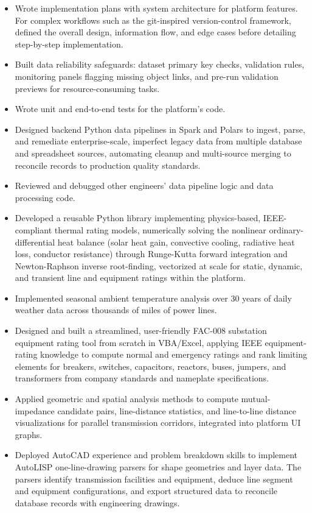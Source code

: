 \documentclass[10pt, letterpaper]{article}
\newenvironment{rlist}{%
  \begin{itemize}[leftmargin=1.4em, itemsep=1pt, topsep=2pt, parsep=0pt]%
}{%
  \end{itemize}%
}
\begin{document}
\begin{rlist}
  \item Wrote implementation plans with system architecture for platform features. For complex workflows such as the git-inspired version-control framework, defined the overall design, information flow, and edge cases before detailing step-by-step implementation.
  \item Built data reliability safeguards: dataset primary key checks, validation rules, monitoring panels flagging missing object links, and pre-run validation previews for resource-consuming tasks.
  \item Wrote unit and end-to-end tests for the platform's code.
  \item Designed backend Python data pipelines in Spark and Polars to ingest, parse, and remediate enterprise-scale, imperfect legacy data from multiple database and spreadsheet sources, automating cleanup and multi-source merging to reconcile records to production quality standards.
  \item Reviewed and debugged other engineers' data pipeline logic and data processing code.
  \item Developed a reusable Python library implementing physics-based, IEEE-compliant thermal rating models, numerically solving the nonlinear ordinary-differential heat balance (solar heat gain, convective cooling, radiative heat loss, conductor resistance) through Runge-Kutta forward integration and Newton-Raphson inverse root-finding, vectorized at scale for static, dynamic, and transient line and equipment ratings within the platform.
  \item Implemented seasonal ambient temperature analysis over 30 years of daily weather data across thousands of miles of power lines.
  \item Designed and built a streamlined, user-friendly FAC-008 substation equipment rating tool from scratch in VBA/Excel, applying IEEE equipment-rating knowledge to compute normal and emergency ratings and rank limiting elements for breakers, switches, capacitors, reactors, buses, jumpers, and transformers from company standards and nameplate specifications.
  \item Applied geometric and spatial analysis methods to compute mutual-impedance candidate pairs, line-distance statistics, and line-to-line distance visualizations for parallel transmission corridors, integrated into platform UI graphs.
  \item Deployed AutoCAD experience and problem breakdown skills to implement AutoLISP one-line-drawing parsers for shape geometries and layer data. The parsers identify transmission facilities and equipment, deduce line segment and equipment configurations, and export structured data to reconcile database records with engineering drawings.
\end{rlist}
\end{document}
